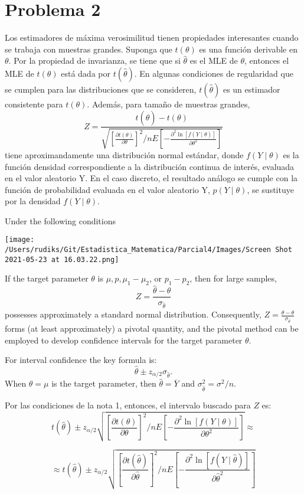 \section{Problema 2}


Los estimadores de máxima verosimilitud tienen propiedades interesantes cuando se trabaja con muestras grandes. Suponga que $t(\theta)$ es una función derivable en $\theta$. Por la propiedad de invarianza, se tiene que si $\hat{\theta}$ es el MLE de $\theta$, entonces el MLE de $t(\theta)$ está dada por $t(\hat{\theta}) .$ En algunas condiciones de regularidad que se cumplen para las distribuciones que se consideren, $t(\hat{\theta})$ es un estimador consistente para $t(\theta) .$ Además, para tamaño de muestras grandes,
$$
Z=\frac{t(\hat{\theta})-t(\theta)}{\sqrt{\left[\frac{\partial t(\theta)}{\partial \theta}\right]^{2} \Big/ n E\left[-\frac{\partial^{2} \ln [f(Y \mid \theta)]}{\partial \theta^{2}}\right]}}
$$
tiene aproximandamente una distribución normal estándar, donde $f(Y \mid \theta)$ es la función densidad correspondiente a la distribución continua de interés, evaluada en el valor aleatorio Y. En el caso discreto, el resultado análogo se cumple con la función de probabilidad evaluada en el valor aleatorio $\mathrm{Y}$, $p(Y \mid \theta)$, se sustituye por la densidad $f(Y \mid \theta)$. 
\begin{tcolorbox}[colback=blue!15,colframe=blue!1!blue,title=Nota 1]
	Under the following conditions
\begin{center}
	\texttt{[image: /Users/rudiks/Git/Estadistica\_Matematica/Parcial4/Images/Screen Shot 2021-05-23 at 16.03.22.png]}
\end{center}
If the target parameter $\theta$  is $\mu, p, \mu_1 -\mu_2$, or $p_1 - p_2$, then for large samples,
$$Z=\frac{\hat{\theta}-\theta}{\sigma_{\hat{\theta}} }$$
possesses approximately a standard normal distribution. Consequently, $Z=\frac{\hat{\theta}-\theta}{\sigma_{\hat{\theta}} }$ forms (at least approximately) a pivotal quantity, and the pivotal method can be employed to develop confidence intervals for the target parameter $\theta$.\newline 

For interval confidence the key formula is: 
$$\hat{\theta}\pm z_{\alpha/2}\sigma_{\hat{\theta}}.$$
When $\theta=\mu$ is the target parameter, then $\hat{\theta}=\overline{Y}$ and $\sigma^2_{\hat{\theta}}=\sigma^2/n$. 
	\end{tcolorbox}

\begin{tcolorbox}[colback=blue!15,colframe=blue!1!blue,title=Nota 2]
	Por las condiciones de la nota 1, entonces, el intervalo buscado para $Z$ es: 
	$$t(\hat{\theta})\pm z_{\alpha/2}\sqrt{\left[\frac{\partial t(\theta)}{\partial \theta}\right]^{2} \Big/ n E\left[-\frac{\partial^{2} \ln [f(Y \mid \theta)]}{\partial \theta^{2}}\right]}\approx$$
	
	$$\approx t(\hat{\theta})\pm z_{\alpha/2}\sqrt{\left[\frac{\partial t(\hat{\theta})}{\partial \hat{\theta}}\right]^{2} \Big/ n E\left[-\frac{\partial^{2} \ln [f(Y \mid \hat{\theta})]}{\partial \hat{\theta}^{2}}\right]}$$
\end{tcolorbox}


